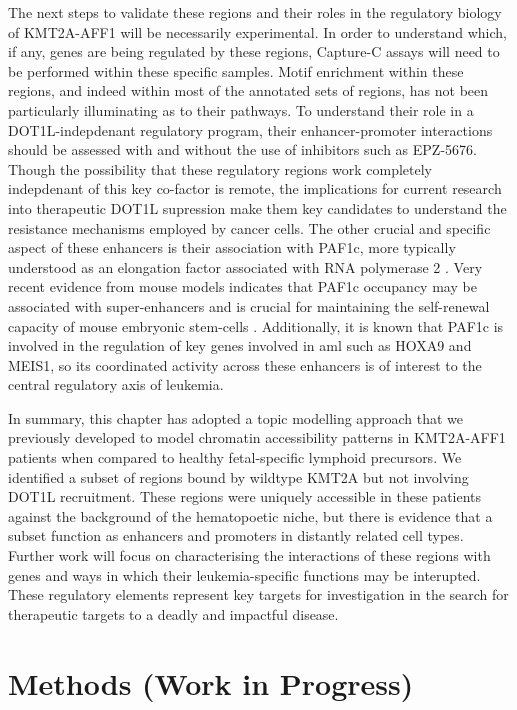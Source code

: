 The next steps to validate these regions and their roles in the regulatory biology of KMT2A-AFF1 will be necessarily experimental. In order to understand which, if any, genes are being regulated by these regions, Capture-C assays will need to be performed within these specific samples. Motif enrichment within these regions, and indeed within most of the annotated sets of regions, has not been particularly illuminating as to their pathways. To understand their role in a DOT1L-indepdenant regulatory program, their enhancer-promoter interactions should be assessed with and without the use of inhibitors such as EPZ-5676. Though the possibility that these regulatory regions work completely indepdenant of this key co-factor is remote, the implications for current research into therapeutic DOT1L supression make them key candidates to understand the resistance mechanisms employed by cancer cells. The other crucial and specific aspect of these enhancers is their association with PAF1c, more typically understood as an elongation factor associated with RNA polymerase 2 \cite{Oss2017,Yang2016,Hou2019,Jaehning2010}. Very recent evidence from mouse models indicates that PAF1c occupancy may be associated with super-enhancers and is crucial for maintaining the self-renewal capacity of mouse embryonic stem-cells \cite{Ding2021}. Additionally, it is known that PAF1c is involved in the regulation of key genes involved in \gls{aml} such as HOXA9 and MEIS1, so its coordinated activity across these enhancers is of interest to the central regulatory axis of leukemia. 

In summary, this chapter has adopted a topic modelling approach that we previously developed to model chromatin accessibility patterns in KMT2A-AFF1 patients when compared to healthy fetal-specific lymphoid precursors. We identified a subset of regions bound by wildtype KMT2A but not involving DOT1L recruitment. These regions were uniquely accessible in these patients against the background of the hematopoetic niche, but there is evidence that a subset function as enhancers and promoters in distantly related cell types. Further work will focus on characterising the interactions of these regions with genes and ways in which their leukemia-specific functions may be interupted. These regulatory elements represent key targets for investigation in the search for therapeutic targets to a deadly and impactful disease.  


\section{Methods (Work in Progress)} \label{ch5:methods}

